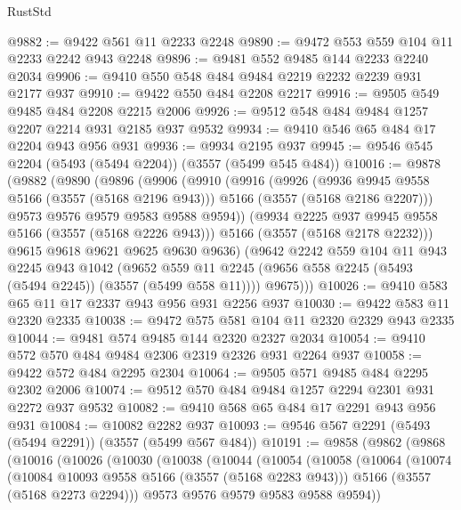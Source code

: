 \begin{lexlean}{RustStd}
\begin{coremodule}
@9882 := @9422 @561 @11 @2233 @2248
@9890 := @9472 @553 @559 @104 @11 @2233 @2242 @943 @2248
@9896 := @9481 @552 @9485 @144 @2233 @2240 @2034
@9906 := @9410 @550 @548 @484 @9484 @2219 @2232 @2239 @931 @2177 @937
@9910 := @9422 @550 @484 @2208 @2217
@9916 := @9505 @549 @9485 @484 @2208 @2215 @2006
@9926 := @9512 @548 @484 @9484 @1257 @2207 @2214 @931 @2185 @937 @9532
@9934 := @9410 @546 @65 @484 @17 @2204 @943 @956 @931
@9936 := @9934 @2195 @937
@9945 := @9546 @545 @2204 (@5493 (@5494 @2204)) (@3557 (@5499 @545 @484))
@10016 := @9878
    (@9882
      (@9890
        (@9896
          (@9906
            (@9910
              (@9916
                (@9926
                  (@9936 @9945 @9558 @5166 (@3557 (@5168 @2196 @943)))
                  @5166
                  (@3557 (@5168 @2186 @2207)))
                @9573
                @9576
                @9579
                @9583
                @9588
                @9594))
            (@9934 @2225 @937 @9945 @9558 @5166 (@3557 (@5168 @2226 @943)))
            @5166
            (@3557 (@5168 @2178 @2232)))
          @9615
          @9618
          @9621
          @9625
          @9630
          @9636)
        (@9642
          @2242
          @559
          @104
          @11
          @943
          @2245
          @943
          @1042
          (@9652 @559 @11 @2245 (@9656 @558 @2245 (@5493 (@5494 @2245)) (@3557 (@5499 @558 @11))))
          @9675)))
@10026 := @9410 @583 @65 @11 @17 @2337 @943 @956 @931 @2256 @937
@10030 := @9422 @583 @11 @2320 @2335
@10038 := @9472 @575 @581 @104 @11 @2320 @2329 @943 @2335
@10044 := @9481 @574 @9485 @144 @2320 @2327 @2034
@10054 := @9410 @572 @570 @484 @9484 @2306 @2319 @2326 @931 @2264 @937
@10058 := @9422 @572 @484 @2295 @2304
@10064 := @9505 @571 @9485 @484 @2295 @2302 @2006
@10074 := @9512 @570 @484 @9484 @1257 @2294 @2301 @931 @2272 @937 @9532
@10082 := @9410 @568 @65 @484 @17 @2291 @943 @956 @931
@10084 := @10082 @2282 @937
@10093 := @9546 @567 @2291 (@5493 (@5494 @2291)) (@3557 (@5499 @567 @484))
@10191 := @9858
    (@9862
      (@9868
        (@10016
          (@10026
            (@10030
              (@10038
                (@10044
                  (@10054
                    (@10058
                      (@10064
                        (@10074
                          (@10084 @10093 @9558 @5166 (@3557 (@5168 @2283 @943)))
                          @5166
                          (@3557 (@5168 @2273 @2294)))
                        @9573
                        @9576
                        @9579
                        @9583
                        @9588
                        @9594))

\end{coremodule}
\end{lexlean}
